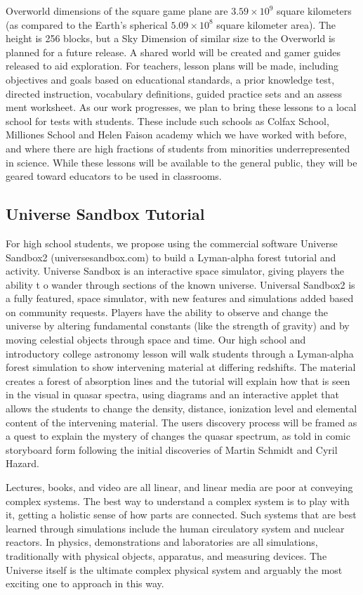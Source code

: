 Overworld dimensions of the square game plane are $3.59 \times 10^{9}$
 square kilometers 
(as compared to the Earth’s spherical $5.09 \times 10^{8}$
 square kilometer area). 
The height  is 256 blocks, but a Sky Dimension of similar size to the 
Overworld is 
planned for a future release. A shared world will be created and gamer guides 
released to aid exploration. For teachers, lesson plans will be made, 
including 
objectives and goals based on educational standards, a prior knowledge test, 
directed instruction, vocabulary definitions, guided practice sets and an assess
ment 
worksheet. As our work progresses, we plan to bring these lessons to a local 
school 
for tests with students.
These include such schools as Colfax School, Milliones School and Helen Faison
academy which we have worked with before, and where there are high fractions
of students from minorities underrepresented in science.
 While these lessons will be available to the 
general public, they will be geared toward educators to be used in classrooms.

\subsection{Universe Sandbox Tutorial}


For high school students, 
we propose using the commercial software Universe Sandbox2 
 (universesandbox.com) to build a Lyman-alpha forest tutorial 
and activity. 
Universe Sandbox is an interactive space simulator, giving players the ability t
o 
wander through sections of the known universe. Universal Sandbox2 is a fully 
featured, space simulator, with new features and simulations added 
based on community requests. Players have the ability to observe and 
change the universe by altering fundamental constants (like the strength of 
gravity) and by moving celestial objects through space and time. 
Our high school and introductory college astronomy lesson will walk 
students through a Lyman-alpha forest simulation to show intervening 
material at differing redshifts. The material creates a forest of absorption 
lines and the tutorial will explain how that is seen in the visual in quasar 
spectra, using diagrams and an interactive applet that allows the students to 
change the density, distance, ionization level and elemental content of the 
intervening material. The users discovery process will be framed as a quest to 
explain the mystery of changes the quasar spectrum, as told in 
comic storyboard 
form following the initial discoveries of Martin Schmidt and Cyril Hazard. 

 

Lectures, books, and video are all linear, and linear media are poor at 
conveying complex systems.  The best way to understand a complex 
system is to play with it, getting a holistic sense of how parts are 
connected.  Such systems that are best learned through simulations 
include the human circulatory system and nuclear reactors. 
In physics, demonstrations and laboratories are all simulations, 
traditionally with physical objects, apparatus, and measuring devices.
The Universe itself is the ultimate complex physical system and arguably
the most exciting one to approach in this way.



